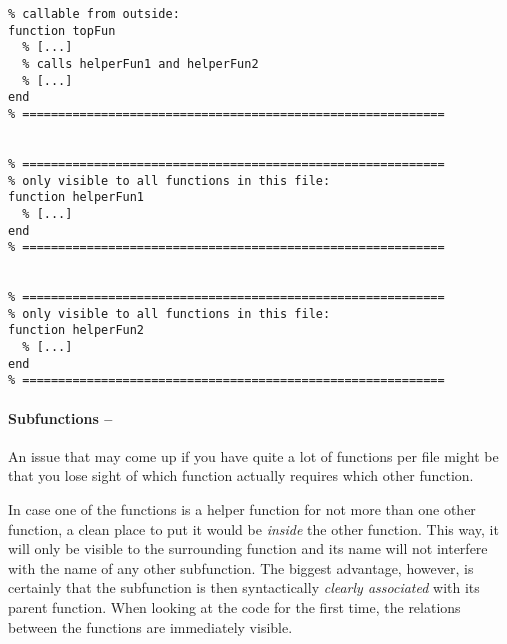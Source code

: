 \begin{lstlisting}[framerule=2pt,rulecolor=\color{goodgreen},float,label={listing:multiple-functions},caption={One source containing three functions: Useful when \lstinline!helperFun1! and \lstinline!helperFun2! are only needed by \lstinline!topFun!.}]
% ===========================================================
% callable from outside:
function topFun
  % [...]
  % calls helperFun1 and helperFun2
  % [...]
end
% ===========================================================


% ===========================================================
% only visible to all functions in this file:
function helperFun1
  % [...]
end
% ===========================================================


% ===========================================================
% only visible to all functions in this file:
function helperFun2
  % [...]
end
% ===========================================================
\end{lstlisting}


\paragraph{Subfunctions -- \cleansymbol\cleansymbol}
An issue that may come up if you have quite a lot of functions per file might
be that you lose sight of which function actually requires which other
function.

In case one of the functions is a helper function for not more than one other
function, a clean place to put it would be \emph{inside} the other function.
This way, it will only be visible to the surrounding function and its name
will not interfere with the name of any other subfunction. The biggest
advantage, however, is certainly that the subfunction is then syntactically
\emph{clearly associated} with its parent function. When looking at the code
for the first time, the relations between the functions are immediately
visible.


